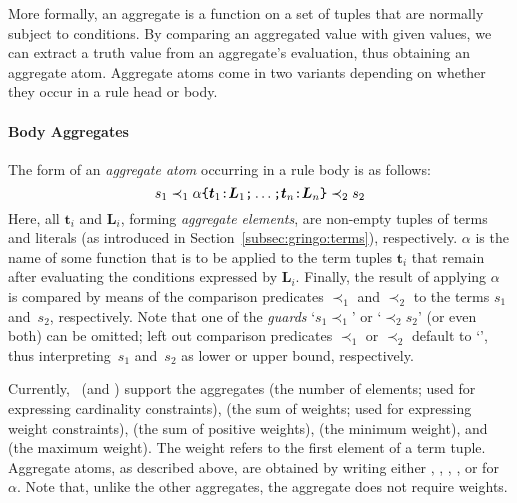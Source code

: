 More formally,
an aggregate is a function on a set of tuples that are normally subject to conditions.
By comparing an aggregated value with given values, we can extract a truth value from an aggregate's evaluation,
thus
obtaining an aggregate atom.
Aggregate atoms come in two variants depending on whether they occur in a rule head or body.

\paragraph{Body Aggregates}
The form of an \emph{aggregate atom} occurring in a rule body is as follows:
%
$$s_1\prec_1\alpha\texttt{\{}\boldsymbol{t}_1\texttt{:}\boldsymbol{L}_1\texttt{;}\dots\texttt{;}\boldsymbol{t}_n\texttt{:}\boldsymbol{L}_n\texttt{\}}\prec_2 s_2$$
%
Here, all $\boldsymbol{t}_i$ and $\boldsymbol{L}_i$, forming \emph{aggregate elements}, are non-empty tuples of terms and literals
(as introduced in Section~\ref{subsec:gringo:terms}), respectively.
$\alpha$ is the name of some function that is to be applied to the term tuples $\boldsymbol{t}_i$
that remain after evaluating the conditions expressed by $\boldsymbol{L}_i$.
%
Finally,
the result of applying $\alpha$ is compared by means of the comparison predicates $\prec_1$ and $\prec_2$
to the terms $s_1$ and~$s_2$, respectively.
Note that one of the \emph{guards} `$s_1\prec_1$' or `$\prec_2 s_2$'
(or even both) can be omitted;
left out comparison predicates $\prec_1$ or $\prec_2$ default to `\code{<=}',
thus interpreting~$s_1$ and~$s_2$ as lower or upper bound, respectively.

Currently, \gringo\ (and \clingo) support the aggregates
%
(the number of elements; used for expressing cardinality constraints),
%
(the sum of weights; used for expressing weight constraints),
%
(the sum of positive weights),
%
(the minimum weight), and
%
(the maximum weight).
The weight refers to the first element of a term tuple.
Aggregate atoms, as described above, are obtained by writing
either , , , , or  for~$\alpha$.
%
Note that, unlike the other aggregates, the  aggregate does not require weights.

